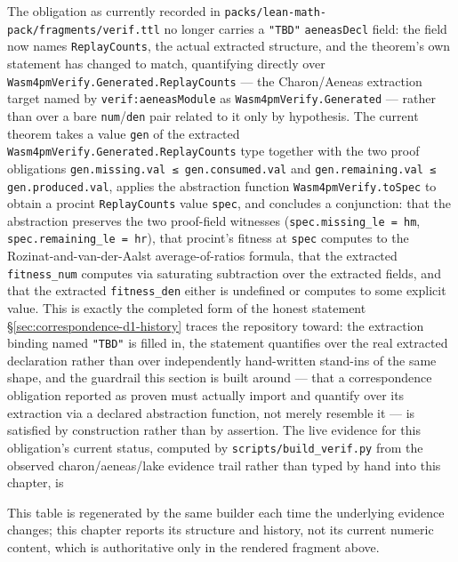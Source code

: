 The obligation as currently recorded in
\texttt{packs/lean-math-pack/fragments/verif.ttl} no longer carries a
\texttt{"TBD"} \texttt{aeneasDecl} field: the field now names
\texttt{ReplayCounts}, the actual extracted structure, and the
theorem's own statement has changed to match, quantifying directly over
\texttt{Wasm4pmVerify.Generated.ReplayCounts} --- the Charon/Aeneas
extraction target named by \texttt{verif:aeneasModule} as
\texttt{Wasm4pmVerify.Generated} --- rather than over a bare
\texttt{num}/\texttt{den} pair related to it only by hypothesis. The
current theorem takes a value \texttt{gen} of the extracted
\texttt{Wasm4pmVerify.Generated.ReplayCounts} type together with the two
proof obligations \texttt{gen.missing.val ≤ gen.consumed.val} and
\texttt{gen.remaining.val ≤ gen.produced.val}, applies the abstraction
function \texttt{Wasm4pmVerify.toSpec} to obtain a \textsf{procint}
\texttt{ReplayCounts} value \texttt{spec}, and concludes a conjunction:
that the abstraction preserves the two proof-field witnesses
(\texttt{spec.missing\_le = hm}, \texttt{spec.remaining\_le = hr}), that
\textsf{procint}'s fitness at \texttt{spec} computes to the
Rozinat-and-van-der-Aalst average-of-ratios formula, that the extracted
\texttt{fitness\_num} computes via saturating subtraction over the
extracted fields, and that the extracted \texttt{fitness\_den} either is
undefined or computes to some explicit value. This is exactly the
completed form of the honest statement
\S\ref{sec:correspondence-d1-history} traces the repository toward: the
extraction binding named \texttt{"TBD"} is filled in, the statement
quantifies over the real extracted declaration rather than over
independently hand-written stand-ins of the same shape, and the guardrail
this section is built around --- that a correspondence obligation
reported as proven must actually import and quantify over its extraction
via a declared abstraction function, not merely resemble it --- is
satisfied by construction rather than by assertion. The live evidence for
this obligation's current status, computed by \texttt{scripts/build\_verif.py}
from the observed charon/aeneas/lake evidence trail rather than typed by
hand into this chapter, is

This table is regenerated by the same builder each time the underlying
evidence changes; this chapter reports its structure and history, not its
current numeric content, which is authoritative only in the rendered
fragment above.
